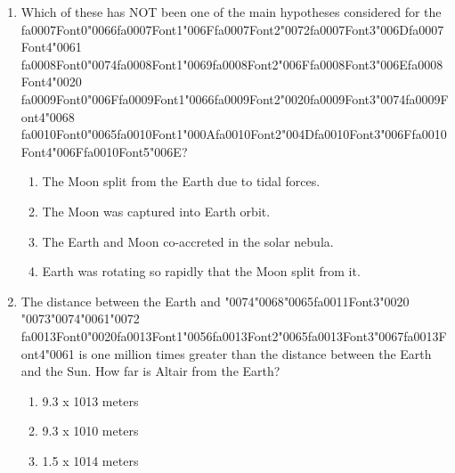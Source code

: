 \documentclass[12pt]{article}
\begin{document}
\begin{enumerate}[label=\arabic*.]
\begin{enumerate}[label=(\alph*)]
    \item Radar from the earth can only see Mercury's poles.
    \item These craters contain the only permanently shadowed regions on Mercury
\end{enumerate}
\item Which of these has NOT been one of the main hypotheses considered for the {\csname fa0007Font0\endcsname\char"0066}{\csname fa0007Font1\endcsname\char"006F}{\csname fa0007Font2\endcsname\char"0072}{\csname fa0007Font3\endcsname\char"006D}{\csname fa0007Font4\endcsname\char"0061} {\csname fa0008Font0\endcsname\char"0074}{\csname fa0008Font1\endcsname\char"0069}{\csname fa0008Font2\endcsname\char"006F}{\csname fa0008Font3\endcsname\char"006E}{\csname fa0008Font4\endcsname\char"0020} {\csname fa0009Font0\endcsname\char"006F}{\csname fa0009Font1\endcsname\char"0066}{\csname fa0009Font2\endcsname\char"0020}{\csname fa0009Font3\endcsname\char"0074}{\csname fa0009Font4\endcsname\char"0068}
{\csname fa0010Font0\endcsname\char"0065}{\csname fa0010Font1\endcsname\char"000A}{\csname fa0010Font2\endcsname\char"004D}{\csname fa0010Font3\endcsname\char"006F}{\csname fa0010Font4\endcsname\char"006F}{\csname fa0010Font5\endcsname\char"006E}?
\begin{enumerate}[label=(\alph*)]
    \item The Moon split from the Earth due to tidal forces.
    \item The Moon was captured into Earth orbit.
    \item The Earth and Moon co-accreted in the solar nebula.
    \item Earth was rotating so rapidly that the Moon split from it.
\end{enumerate}
\item The distance between the Earth and {\char"0074}{\char"0068}{\char"0065}{\csname fa0011Font3\endcsname\char"0020} {\char"0073}{\char"0074}{\char"0061}{\char"0072} {\csname fa0013Font0\endcsname\char"0020}{\csname fa0013Font1\endcsname\char"0056}{\csname fa0013Font2\endcsname\char"0065}{\csname fa0013Font3\endcsname\char"0067}{\csname fa0013Font4\endcsname\char"0061} is one million times greater than the
distance between the Earth and the Sun. How far is Altair from the Earth?
\begin{enumerate}[label=(\alph*)]
    \item 9.3 x 1013 meters
    \item 9.3 x 1010 meters
    \item 1.5 x 1014 meters

\end{enumerate}
\end{enumerate}
\end{document}
